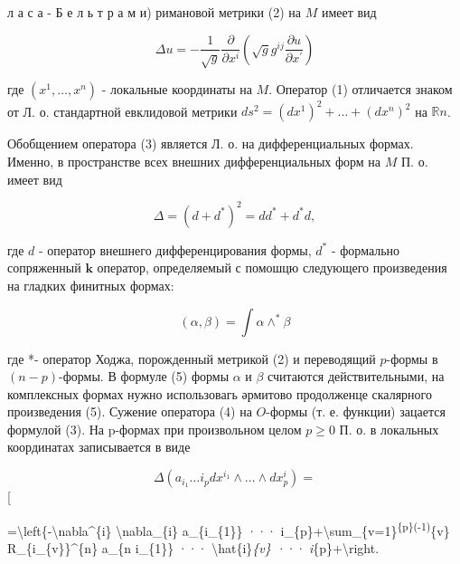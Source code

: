 \documentclass[10pt]{article}
\begin{document}
л а с а - Б е л ь т р а м и) римановой метрики (2) на $M$ имеет вид



\[

\Delta u=-\frac{1}{\sqrt{g}} \frac{\partial}{\partial x^{i}}\left(\sqrt{g} g^{i j} \frac{\partial u}{\partial x^{\prime}}\right)

\]



где $\left(x^{1}, \ldots, x^{n}\right)$ - локальные координаты на $M$. Оператор (1) отличается знаком от Л. о. стандартной евклидовой метрики $d s^{2}=\left(d x^{1}\right)^{2}+\ldots+\left(d x^{n}\right)^{2}$ на $\mathbb{R} n$.



Обобщением оператора (3) является Л. о. на дифференциальных формах. Именно, в пространстве всех внешних дифференциальных форм на $M$ П. о. имеет вид



\[

\Delta=\left(d+d^{*}\right)^{2}=d d^{*}+d^{*} d,

\]



где $d$ - оператор внешнего дифференцирования формы, $d^{*}$ - формально сопряженный $\mathbf{k}$ оператор, определяемый с помошцю следующего произведения на гладких финитных формах:



\[

(\alpha, \beta)=\int \alpha \wedge^{*} \beta

\]



где *- оператор Ходжа, порожденный метрикой (2) и переводящий $p$-формы в $(n-p)$-формы. В формуле (5) формы $\alpha$ и $\beta$ считаются действительными, на комплексных формах нужно использовагь әрмитово продолженце скалярного произведения (5). Сужение оператора (4) на $O$-формы (т. е. функции) зацается формулой (3). На p-формах при произвольном целом $p \geqslant 0$ П. о. в локальных координатах записывается в виде



\[

\Delta\left(a_{i_{1}} \ldots i_{p} d x^{i_{1}} \wedge \ldots \wedge d x_{p}^{i}\right)=

\][



=\textbackslash left\{-\textbackslash nabla\^{}\{i\} \textbackslash nabla\_\{i\} a\_\{i\_\{1\}\} ··· i\_\{p\}+\textbackslash sum\_\{v=1\}\textsuperscript{\{p\}(-1)}\{v\} R\_\{i\_\{v\}\}\^{}\{n\} a\_\{n i\_\{1\}\} ··· \textbackslash hat\{i\}\textit{\{v\} ··· i}\{p\}+\textbackslash right.
\end{document}
